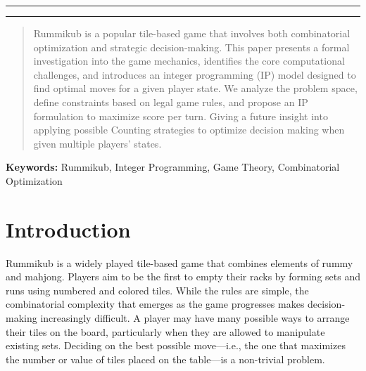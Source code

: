 \documentclass[11pt,letterpaper]{article}
\begin{document}

\rule{17cm}{0.1mm}

\authorrowthree
  {}
  {}
  {}

\authorrowtwo
  {}
  {}

\authorrowone
  {}

\rule{17cm}{0.1mm}

\begin{abstract}
Rummikub is a popular tile-based game that involves both combinatorial optimization 
and strategic decision-making. This paper presents a formal investigation into the game 
mechanics, identifies the core computational challenges, and introduces an integer 
programming (IP) model designed to find optimal moves for a given player state. 
We analyze the problem space, define constraints based on legal game rules, and 
propose an IP formulation to maximize score per turn. Giving a future insight into 
applying possible Counting strategies to optimize decision making when given 
multiple players' states.
\end{abstract}

\smallskip
\noindent\textbf{Keywords:} Rummikub, Integer Programming, Game Theory, Combinatorial Optimization
\section*{Introduction}
Rummikub is a widely played tile-based game that combines elements of rummy and mahjong. 
Players aim to be the first to empty their racks by forming sets and runs using numbered 
and colored tiles. While the rules are simple, the combinatorial complexity that emerges 
as the game progresses makes decision-making increasingly difficult. A player may have 
many possible ways to arrange their tiles on the board, particularly when they are allowed 
to manipulate existing sets. Deciding on the best possible move—i.e., the one that maximizes 
the number or value of tiles placed on the table—is a non-trivial problem.
\end{document}
